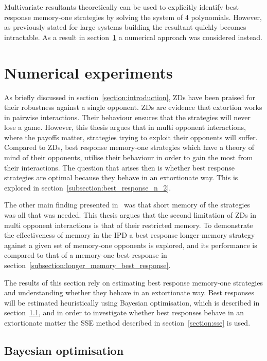 Multivariate resultants theoretically can be used to explicitly identify best
response memory-one strategies by solving the system of 4 polynomials. However,
as previously stated for large systems building the resultant quickly becomes
intractable. As a result in section~\ref{section:numerical_experiments}
a numerical approach was considered instead.

\section{Numerical experiments} \label{section:numerical_experiments}

As briefly discussed in section~\ref{section:introduction}, ZDs have been
praised for their robustness against a single opponent. ZDs are evidence that
extortion works in pairwise interactions. Their behaviour ensures that the
strategies will never lose a game. However, this thesis argues that in multi
opponent interactions, where the payoffs matter, strategies trying to exploit
their opponents will suffer. Compared to ZDs, best response memory-one
strategies which have a theory of mind of their opponents, utilise their
behaviour in order to gain the most from their interactions. The question that
arises then is whether best response strategies are optimal because they behave
in an extortionate way. This is explored in
section~\ref{subsection:best_response_n_2}.

The other main finding presented in~\cite{Press2012} was that short memory of
the strategies was all that was needed. This thesis argues that the second
limitation of ZDs in multi opponent interactions is that of their restricted
memory. To demonstrate the effectiveness of memory in the IPD a best response
longer-memory strategy against a given set of memory-one opponents is explored,
and its performance is compared to that of a memory-one best response in
section~\ref{subsection:longer_memory_best_response}.

The results of this section rely on estimating best response memory-one
strategies and understanding whether they behave in an extortionate way. Best
responses will be estimated heuristically using Bayesian optimisation, which is
described in section~\ref{section:bayesian_optimisation}, and in order to
investigate whether best responses behave in an extortionate matter the SSE
method described in section~\ref{section:sse} is used.

\subsection{Bayesian optimisation}\label{section:bayesian_optimisation}

